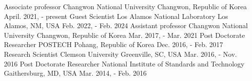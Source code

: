 

\begin{cventries}
  \cventry
  {Associate professor} %
  {Changwon National University}
  {Changwon, Republic of Korea} %
  {April. 2021, - present} %
  {
  }
  \cventry
  {Guest Scientist} %
  {Los Alamos National Laboratory}
  {Los Alamos, NM, USA}
  {Feb. 2022, - Feb. 2024} %
  {
  }
  \cventry
  {Assistant professor} %
  {Changwon National University}
  {Changwon, Republic of Korea} %
  {Mar. 2017, - Mar. 2021} %
  {
  }
  \cventry
  {Post Doctorate Researcher} %
  {POSTECH}
  {Pohang, Republic of Korea} %
  {Dec. 2016, - Feb. 2017} %
  {
  }
  \cventry
  {Research Scientist} %
  {Clemson University}
  {Greenville, SC, USA} %
  {Mar. 2016, - Nov. 2016} %
  {
  }
  \cventry
  {Post Doctorate Researcher} %
  {National Institute of Standards and Technology} %
  {Gaithersburg, MD, USA} %
  {Mar. 2014, - Feb. 2016} %
  {
}
\end{cventries}
